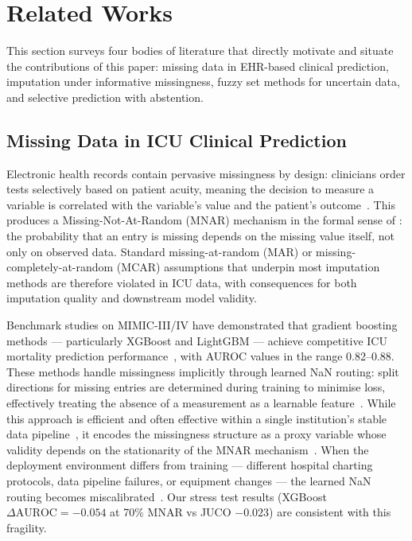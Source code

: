 \documentclass[a4paper,fleqn,longmktitle]{cas-sc}
\begin{document}
	
	\section{Related Works}
	\label{sec:related_works}
	
	This section surveys four bodies of literature that directly
	motivate and situate the contributions of this paper:
	missing data in EHR-based clinical prediction, imputation
	under informative missingness, fuzzy set methods for
	uncertain data, and selective prediction with abstention.
	
	\subsection{Missing Data in ICU Clinical Prediction}
	\label{sec:rw_missing}
	
	Electronic health records contain pervasive missingness by design:
	clinicians order tests selectively based on patient acuity,
	meaning the decision to measure a variable is correlated with
	the variable's value and the patient's
	outcome~\citep{agniel2018biases}.
	This produces a Missing-Not-At-Random (MNAR) mechanism in the
	formal sense of \citet{rubin1976inference}: the probability
	that an entry is missing depends on the missing value itself,
	not only on observed data.
	Standard missing-at-random (MAR) or missing-completely-at-random
	(MCAR) assumptions that underpin most imputation methods are
	therefore violated in ICU data, with consequences for both
	imputation quality and downstream model validity.
	
	Benchmark studies on MIMIC-III/IV have demonstrated that gradient
	boosting methods — particularly XGBoost and LightGBM — achieve
	competitive ICU mortality prediction performance~\citep{johnson2016mimic,johnson2023mimic,
		purushotham2018benchmarking}, with AUROC values in the range 0.82--0.88.
	These methods handle missingness implicitly through learned
	NaN routing: split directions for missing entries are determined
	during training to minimise loss, effectively treating the absence of a measurement as a
	learnable feature~\citep{chen2016xgboost}.
	While this approach is efficient and often effective within a
	single institution's stable data pipeline~\citep{perezlebel2022benchmarking},
	it encodes the missingness structure as a proxy variable
	whose validity depends on the stationarity of the MNAR
	mechanism~\citep{josse2019consistency,perezlebel2022benchmarking}.
	When the deployment environment differs from training —
	different hospital charting protocols, data pipeline failures,
	or equipment changes — the learned NaN routing becomes
	miscalibrated~\citep{sperrin2020informative}.
	Our stress test results (XGBoost $\Delta\text{AUROC} = -0.054$
	at 70\% MNAR vs JUCO $-0.023$) are consistent with this fragility.
	
\end{document}
